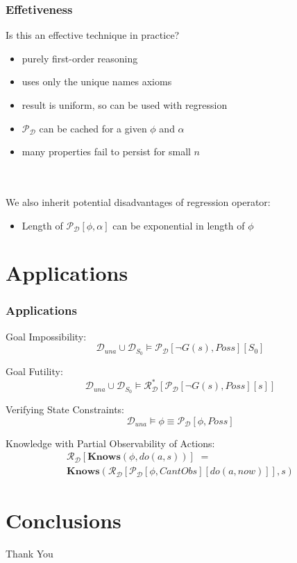 \documentclass[compress]{beamer}
\begin{document}
\begin{frame}
\frametitle{Effetiveness}
Is this an effective technique in practice?
\begin{itemize}
 \item purely first-order reasoning
 \item uses only the unique names axioms
 \item result is uniform, so can be used with regression
 \item $\mathcal{P}_{\mathcal{D}}$ can be cached for a given $\phi$ and $\alpha$
 \item many properties fail to persist for small $n$
\end{itemize}
\ \\
\ \\
We also inherit potential disadvantages of regression operator:
\begin{itemize}
  \item Length of $\mathcal{P}_{\mathcal{D}}[\phi,\alpha]$ can be exponential in length of $\phi$
\end{itemize}
\end{frame}

\section{Applications}

\begin{frame}
\frametitle{Applications}
Goal Impossibility:
\begin{equation*}
\mathcal{D}_{una}\cup\mathcal{D}_{S_0} \models \mathcal{P}_{\mathcal{D}}[\neg G(s),Poss][S_0]
\end{equation*}

Goal Futility:
\begin{equation*}
\mathcal{D}_{una}\cup\mathcal{D}_{S_0} \models \mathcal{R}^*_{\mathcal{D}}[\mathcal{P}_{\mathcal{D}}[\neg G(s),Poss][s]]
\end{equation*}

Verifying State Constraints:
\begin{equation*}
\mathcal{D}_{una} \models \phi \equiv \mathcal{P}_{\mathcal{D}}[\phi,Poss]
\end{equation*}

%
Knowledge with Partial Observability of Actions:
\begin{multline*}
\mathcal{R}_{\mathcal{D}}[\mathbf{Knows}(\phi,do(a,s))]\,\,=\\
  \mathbf{Knows}(\mathcal{R}_{\mathcal{D}}[\mathcal{P}_{\mathcal{D}}[\phi,CantObs][do(a,now)]],s)
\end{multline*}
\end{frame}

\section{Conclusions}

\begin{frame}
\end{frame}

\begin{frame}
\centering \large Thank You\\
\end{frame}
\end{document}
